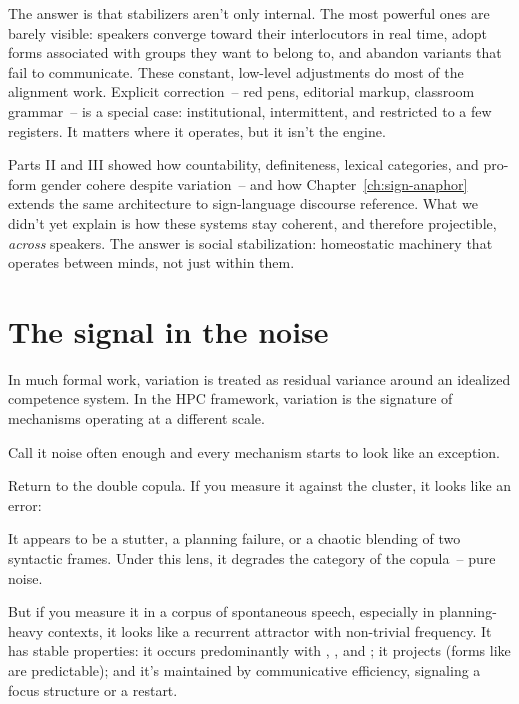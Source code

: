 The answer is that stabilizers aren't only internal. The most powerful ones are barely visible: speakers converge toward their interlocutors in real time, adopt forms associated with groups they want to belong to, and abandon variants that fail to communicate. These constant, low-level adjustments do most of the alignment work. Explicit correction~-- red pens, editorial markup, classroom grammar~-- is a special case: institutional, intermittent, and restricted to a few registers. It matters where it operates, but it isn't the engine.

Parts II and III showed how countability, definiteness, lexical categories, and pro-form gender cohere despite variation~-- and how Chapter~\ref{ch:sign-anaphor} extends the same architecture to sign-language discourse reference. What we didn't yet explain is how these systems stay coherent, and therefore projectible, \emph{across} speakers. The answer is social stabilization: homeostatic machinery that operates between minds, not just within them.

\section{The signal in the noise}
\label{sec:16:signal-in-noise}

In much formal work, variation is treated as residual variance around an idealized competence system. In the HPC framework, variation is the signature of mechanisms operating at a different scale.

Call it noise often enough and every mechanism starts to look like an exception.

Return to the double copula. If you measure it against the  cluster, it looks like an error:

\ea\label{ex:double-copula-narrative}
\ea {}
\ex {}
\z
\z

It appears to be a stutter, a planning failure, or a chaotic blending of two syntactic frames. Under this lens, it degrades the category of the copula~-- pure noise.

But if you measure it in a corpus of spontaneous speech, especially in planning-heavy contexts, it looks like a recurrent attractor with non-trivial frequency. It has stable properties: it occurs predominantly with , , and ; it projects (forms like  are predictable); and it's maintained by communicative efficiency, signaling a focus structure or a restart.

